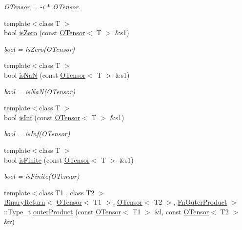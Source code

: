 \begin{DoxyCompactItemize}
\begin{DoxyCompactList}\small\item\em \mbox{\hyperlink{classENSEM_1_1OTensor}{O\+Tensor}} = -\/i $\ast$ \mbox{\hyperlink{classENSEM_1_1OTensor}{O\+Tensor}}. \end{DoxyCompactList}\item 
{\footnotesize template$<$class T $>$ }\\bool \mbox{\hyperlink{group__obstensor_ga9520741647696623fb9f0d8398f50568}{is\+Zero}} (const \mbox{\hyperlink{classENSEM_1_1OTensor}{O\+Tensor}}$<$ T $>$ \&s1)
\begin{DoxyCompactList}\small\item\em bool = is\+Zero(\+O\+Tensor) \end{DoxyCompactList}\item 
{\footnotesize template$<$class T $>$ }\\bool \mbox{\hyperlink{group__obstensor_ga24d19fade61896ac0c88639bd7b00b5a}{is\+NaN}} (const \mbox{\hyperlink{classENSEM_1_1OTensor}{O\+Tensor}}$<$ T $>$ \&s1)
\begin{DoxyCompactList}\small\item\em bool = is\+Na\+N(\+O\+Tensor) \end{DoxyCompactList}\item 
{\footnotesize template$<$class T $>$ }\\bool \mbox{\hyperlink{group__obstensor_ga67d316c95a82bf37cc7607cd64e039a1}{is\+Inf}} (const \mbox{\hyperlink{classENSEM_1_1OTensor}{O\+Tensor}}$<$ T $>$ \&s1)
\begin{DoxyCompactList}\small\item\em bool = is\+Inf(\+O\+Tensor) \end{DoxyCompactList}\item 
{\footnotesize template$<$class T $>$ }\\bool \mbox{\hyperlink{group__obstensor_ga79f475f3909487c15b04b4561acc06ef}{is\+Finite}} (const \mbox{\hyperlink{classENSEM_1_1OTensor}{O\+Tensor}}$<$ T $>$ \&s1)
\begin{DoxyCompactList}\small\item\em bool = is\+Finite(\+O\+Tensor) \end{DoxyCompactList}\item 
{\footnotesize template$<$class T1 , class T2 $>$ }\\\mbox{\hyperlink{structENSEM_1_1BinaryReturn}{Binary\+Return}}$<$ \mbox{\hyperlink{classENSEM_1_1OTensor}{O\+Tensor}}$<$ T1 $>$, \mbox{\hyperlink{classENSEM_1_1OTensor}{O\+Tensor}}$<$ T2 $>$, \mbox{\hyperlink{structENSEM_1_1FnOuterProduct}{Fn\+Outer\+Product}} $>$\+::Type\+\_\+t \mbox{\hyperlink{group__obstensor_ga89521e9a934b14066eac700fe2539b53}{outer\+Product}} (const \mbox{\hyperlink{classENSEM_1_1OTensor}{O\+Tensor}}$<$ T1 $>$ \&l, const \mbox{\hyperlink{classENSEM_1_1OTensor}{O\+Tensor}}$<$ T2 $>$ \&r)

\end{DoxyCompactItemize}
